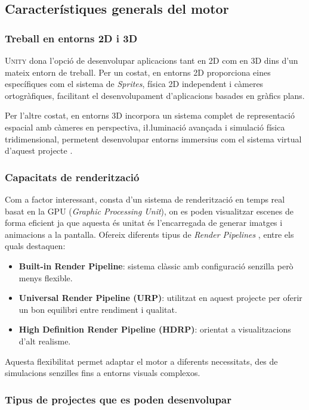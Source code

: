 \documentclass[a4paper,11pt,DIV=13,headings=normal,abstract=true,twoside=semi]{article}
\newcommand{\acro}[1]{\textsc{#1}}
\begin{document}
\subsection{Característiques generals del motor}

\subsubsection{Treball en entorns 2D i 3D}

\acro{Unity} dona l'opció de desenvolupar aplicacions tant en 2D com en 3D dins d'un mateix entorn de treball. Per un costat, en entorns 2D proporciona eines específiques com el sistema de \emph{Sprites}, física 2D independent i càmeres ortogràfiques, facilitant el desenvolupament d'aplicacions basades en gràfics plans.

Per l'altre costat, en entorns 3D incorpora un sistema complet de representació espacial amb càmeres en perspectiva, i\l.luminació avançada i simulació física tridimensional, permetent desenvolupar entorns immersius com el sistema virtual d'aquest projecte \cite{Unity2Dor3D}.

\subsubsection{Capacitats de renderització}
Com a factor interessant, consta d'un sistema de renderització en temps real basat en la \acro{GPU} (\emph{Graphic Processing Unit}), on es poden visualitzar escenes de forma eficient ja que aquesta és unitat és l'encarregada de generar imatges i animacions a la pantalla. Ofereix diferents tipus de \emph{Render Pipelines} \cite{UnityRenderPipelines}, entre els quals destaquen:
\begin{itemize}
    \item \textbf{Built-in Render Pipeline}: sistema clàssic amb configuració senzilla però menys flexible.
    \item \textbf{Universal Render Pipeline (URP)}: utilitzat en aquest projecte per oferir un bon equilibri entre rendiment i qualitat.
    \item \textbf{High Definition Render Pipeline (HDRP)}: orientat a visualitzacions d'alt realisme.
\end{itemize}

Aquesta flexibilitat permet adaptar el motor a diferents necessitats, des de simulacions senzilles fins a entorns visuals complexos.

\subsubsection{Tipus de projectes que es poden desenvolupar}
\end{document}
